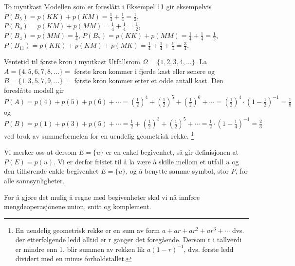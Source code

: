 \begin{eksempel}{To myntkast}
Modellen som er foreslått i Eksempel 11 gir eksempelvis
 $P(B_5)=p(KK)+p(KM)=\frac{1}{4}+\frac{1}{4}=\frac{1}{2}$,
 $P(B_9)=p(KM)+p(MM)=\frac{1}{4}+\frac{1}{4}=\frac{1}{2}$,\\[1mm]
 $P(B_4)=p(MM)=\frac{1}{4}$,
 $P(B_7)=p(KK)+p(MM)=\frac{1}{4}+\frac{1}{4}=\frac{1}{2}$,\\[1mm]
 $P(B_{11})=p(KK)+p(KM)+p(MK)=\frac{1}{4}+\frac{1}{4}+\frac{1}{4}=\frac{3}{4}$.
\end{eksempel}

\begin{eksempel}{Ventetid til første kron i myntkast}
Utfallsrom $\Omega = \{1,2,3,4, \ldots \}$. La $A = \{4,5,6,7,8, \ldots \}
=$ første kron kommer i fjerde kast eller senere og $B =
\{1,3,5,7,9, \ldots \} =$ første kron kommer etter et odde antall
kast. Den foreslåtte modell gir 
$P(A)=p(4)+p(5)+p(6)+\cdots ={(\frac{1}{2})}^4+{(\frac{1}{2})}^5+
{(\frac{1}{2})}^6+ \cdots ={(\frac{1}{2})}^4 \cdot {(1-{\frac{1}{2}})}^{-1}=
\frac{1}{8}$ og $P(B)=p(1)+p(3)+p(5)+\cdots =\frac{1}{2}+{(\frac{1}{2})}^3+
{(\frac{1}{2})}^5+ \cdots =\frac{1}{2} \cdot {(1-{\frac{1}{4}})}^{-1}=
\frac{2}{3}$
 ved bruk av summeformelen for en uendelig geometrisk rekke.
 \footnote{En uendelig geometrisk rekke er en sum av form
     $a+ar+ar^2+ar^3+\cdots$
dvs. der etterfølgende ledd alltid er r ganger det foregående.
Dersom r i tallverdi er mindre enn 1, blir summen av rekken lik
$a(1-r)^{-1}$, dvs. første ledd dividert med en minus forholdstallet.}
\end{eksempel}

Vi merker oss at dersom $E = \{u\}$ er en enkel begivenhet, så
gir defini\-sjonen at $P(E) = p(u)$. Vi er derfor fristet til å la
være å skille mellom et utfall $u$ og den tilhørende enkle
begivenhet $E = \{u\}$, og å benytte samme symbol, stor $P$, for
alle sannsynligheter.

For å gjøre det mulig å regne med begivenheter skal vi nå
 innføre mengdeoperasjonene union, snitt og komplement. \\

